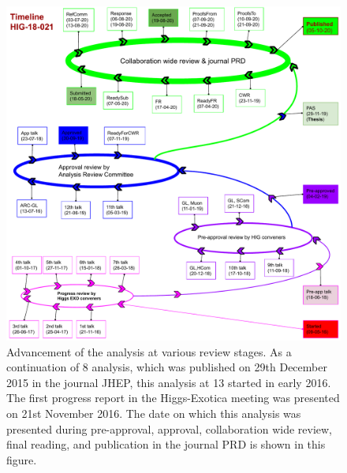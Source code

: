 
\begin{figure}
\centering
\includegraphics[width=1.0\textwidth]{Image/Timeline_HIG-18-021.pdf}
\caption*{Advancement of the analysis at various review stages. As a
continuation of 8 \TeV analysis, which was published on 29th December 
2015 in the journal JHEP, this analysis at 13 \TeV started in early 2016. 
The first progress report in the Higgs-Exotica meeting was presented on 
21st November 2016. The date on which this analysis was presented 
during pre-approval, approval, collaboration wide review, final reading, 
and publication in the journal PRD is shown in this figure.}
\end{figure}
